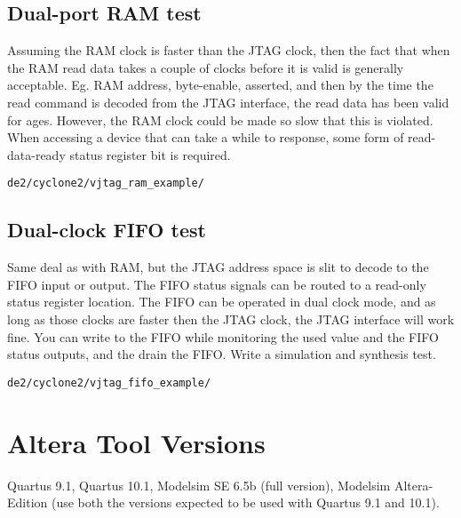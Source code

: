 \documentclass[10pt,twoside]{article}
\begin{document}
\subsection{Dual-port RAM test}

Assuming the RAM clock is faster than the JTAG clock, then
the fact that when the RAM read data takes a couple of clocks
before it is valid is generally acceptable. Eg. RAM address,
byte-enable, asserted, and then by the time the read command
is decoded from the JTAG interface, the read data has been
valid for ages. However, the RAM clock could be made so slow
that this is violated. When accessing a device that can take
a while to response, some form of read-data-ready status
register bit is required.

\verb+de2/cyclone2/vjtag_ram_example/+

\subsection{Dual-clock FIFO test}

Same deal as with RAM, but the JTAG address space is slit to
decode to the FIFO input or output. The FIFO status signals
can be routed to a read-only status register location.
The FIFO can be operated in dual clock mode, and as long
as those clocks are faster then the JTAG clock, the JTAG
interface will work fine. You can write to the FIFO while
monitoring the used value and the FIFO status outputs, and
the drain the FIFO. Write a simulation and synthesis test.

\verb+de2/cyclone2/vjtag_fifo_example/+

\clearpage
\appendix
\section{Altera Tool Versions}

Quartus 9.1, Quartus 10.1, Modelsim SE 6.5b (full version),
Modelsim Altera-Edition (use both the versions expected to
be used with Quartus 9.1 and 10.1).
\end{document}

